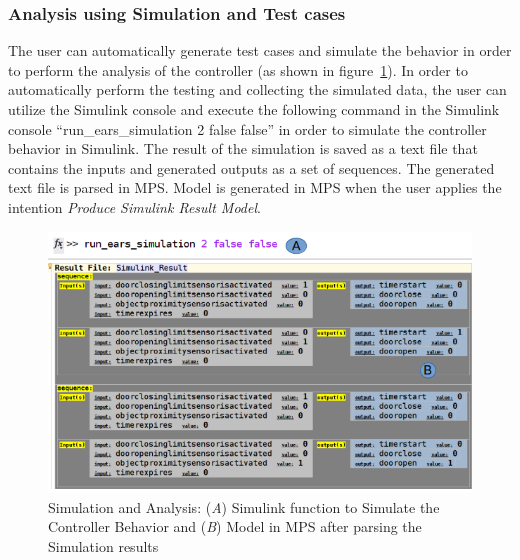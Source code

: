 \subsubsection{Analysis using Simulation and Test cases}
The user can automatically generate test cases and simulate the behavior in
order to perform the analysis of the controller
(as shown in figure~\ref{fig:SimandAnalysis}). In order to automatically perform
the testing and collecting the simulated data, the user can utilize the Simulink console and execute the following command in the Simulink console
``run\_ears\_simulation 2 false false'' in order to simulate the
controller behavior in Simulink. The result of the simulation is saved as a text file that contains the inputs and generated outputs as a set of sequences. The generated text file is parsed in MPS. Model
is generated in MPS when the user applies the intention \emph{Produce Simulink Result Model}.
\begin{figure}[!h]
\centering
\includegraphics[width=1\textwidth]{./images/Simulation_and_Analysis.png}
\caption{Simulation and Analysis: (\emph{A}) Simulink function to Simulate the
Controller Behavior and (\emph{B}) Model in MPS after parsing the
Simulation results}
\label{fig:SimandAnalysis}
\end{figure}
